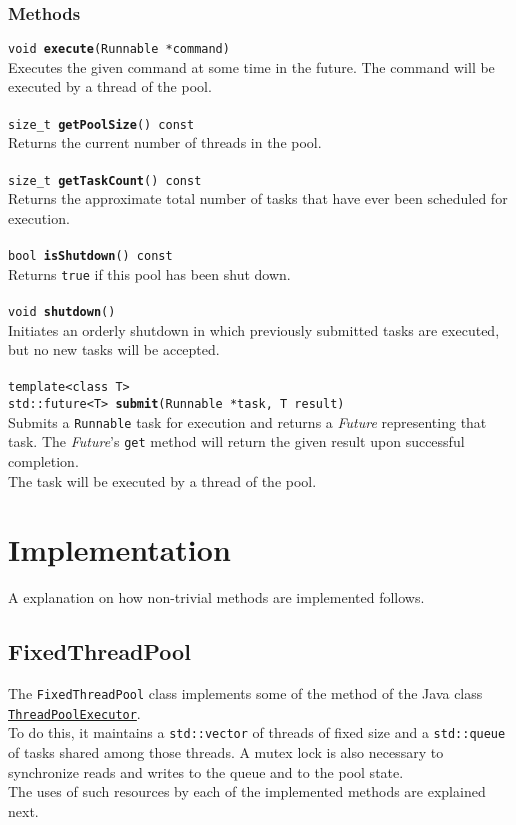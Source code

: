 \documentclass[10pt,twocolumn,letterpaper]{article}
\begin{document}
	\subsubsection{Methods}
	\texttt{void \textbf{execute}(Runnable *command)}\\
	Executes the given command at some time in the future. The command will be executed by a thread of the pool.\\\\
	\texttt{size\_t \textbf{getPoolSize}() const}\\
	Returns the current number of threads in the pool.\\\\
	\texttt{size\_t \textbf{getTaskCount}() const}\\
	Returns the approximate total number of tasks that have ever been scheduled for execution.\\\\
	\texttt{bool \textbf{isShutdown}() const}\\
	Returns \texttt{true} if this pool has been shut down.\\\\
	\texttt{void \textbf{shutdown}()}\\
	Initiates an orderly shutdown in which previously submitted tasks are executed, but no new tasks will be accepted.\\\\
	\texttt{template<class T>\\
		std::future<T> \textbf{submit}(Runnable *task, T result)}\\
	Submits a \lstinline|Runnable| task for execution and returns a \textit{Future} representing that task. The \textit{Future}'s \lstinline|get| method will return the given result upon successful completion.\\
	The task will be executed by a thread of the pool.
	
	\section{Implementation}
	A explanation on how non-trivial methods are implemented follows.
	\subsection{FixedThreadPool}
	The \lstinline|FixedThreadPool| class implements some of the method of the Java class \href{https://docs.oracle.com/javase/7/docs/api/java/util/concurrent/ThreadPoolExecutor.html}{\lstinline|ThreadPoolExecutor|}.\\
	To do this, it maintains a \lstinline|std::vector| of threads of fixed size and a \lstinline|std::queue| of tasks shared among those threads. A mutex lock is also necessary to synchronize reads and writes to the queue and to the pool state.\\
	The uses of such resources by each of the implemented methods are explained next.
\end{document}
